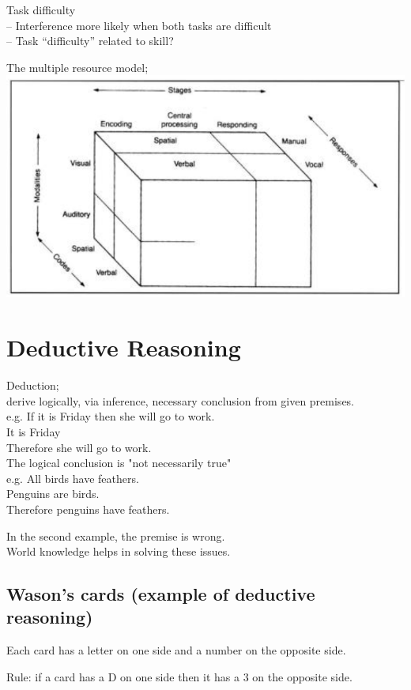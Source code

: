 \documentclass[]{project_plan}
\begin{document}
Task difficulty\\
– Interference more likely when both tasks are difficult\\
– Task “difficulty” related to skill?

The multiple resource model;\\
\includegraphics[width=\linewidth]{multiple_resource_model.png}

\section{Deductive Reasoning}

Deduction;\\
derive logically, via inference, necessary conclusion from given premises.\\
e.g. If it is Friday then she will go to work.\\
It is Friday\\
Therefore she will go to work.\\
The logical conclusion is "not necessarily true"\\
e.g. All birds have feathers.\\
Penguins are birds.\\
Therefore penguins have feathers.

In the second example, the premise is wrong.\\
World knowledge helps in solving these issues.

\subsection{Wason's cards (example of deductive reasoning)}
Each card has a letter on one side and a number on the opposite side.

Rule: if a card has a D on one side then it has a 3 on the opposite side.
\end{document}
